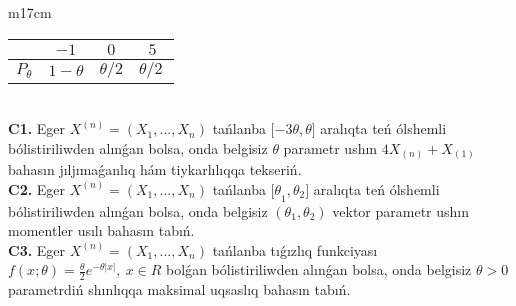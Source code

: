 \documentclass{article}
\begin{document}
\begin{tabular}{m{17cm}}
\begin{tabular}{|c|c|c|c|}
&
$- 1$
&
$0$
&
$5$\\
\hline
\(P_{\theta}\) & \(1 - \theta\) & \(\theta/2\) & \(\theta/2\ \) \\
\hline
\end{tabular}
 \\
\textbf{C1.} 
Eger \(X^{(n)} = \left( X_{1},...,X_{n} \right)\) tańlanba \(\lbrack - 3\theta,\theta\rbrack\) aralıqta teń ólshemli bólistiriliwden alınǵan bolsa, onda belgisiz \(\theta\) parametr ushın \(4X_{(n)} + X_{(1)}\) bahasın jıljımaǵanlıq hám tiykarlılıqqa tekseriń.
 \\
\textbf{C2.} 
Eger \(X^{(n)} = \left( X_{1},...,X_{n} \right)\) tańlanba \({\lbrack\theta}_{1},\theta_{2}\rbrack\) aralıqta teń ólshemli bólistiriliwden alınǵan bolsa, onda belgisiz \(\left( \theta_{1},\theta_{2} \right)\) vektor parametr ushın momentler usılı bahasın tabıń.
 \\
\textbf{C3.} 
Eger \(X^{(n)} = \left( X_{1},...,X_{n} \right)\) tańlanba tıǵızlıq funkciyası
$f(x;\theta) = \frac{\theta}{2}e^{- \theta|x|},\ x \in R$
bolǵan bólistiriliwden alınǵan bolsa, onda belgisiz \(\theta > 0\) parametrdiń shınlıqqa maksimal uqsaslıq bahasın tabıń.
 \\

\end{tabular}
\vspace{1cm}
\end{document}
